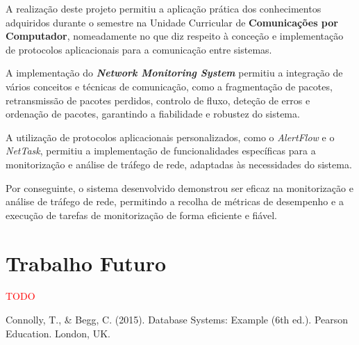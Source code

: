 \documentclass[a4paper,12pt]{scrreprt}
\begin{document}
A realização deste projeto permitiu a aplicação prática dos conhecimentos adquiridos
durante o semestre na Unidade Curricular de \textbf{Comunicações por Computador},
nomeadamente no que diz respeito à conceção e implementação de protocolos aplicacionais
para a comunicação entre sistemas. 

A implementação do \textbf{\textit{Network Monitoring System}} permitiu a integração de
vários conceitos e técnicas de comunicação, como a fragmentação de pacotes, retransmissão
de pacotes perdidos, controlo de fluxo, deteção de erros e ordenação de pacotes, garantindo
a fiabilidade e robustez do sistema.

A utilização de protocolos aplicacionais personalizados, como o \textit{AlertFlow} e o
\textit{NetTask}, permitiu a implementação de funcionalidades específicas para a
monitorização e análise de tráfego de rede, adaptadas às necessidades do sistema.


Por conseguinte, o sistema desenvolvido demonstrou ser eficaz na monitorização e
análise de tráfego de rede, permitindo a recolha de métricas de
desempenho e a execução de tarefas de monitorização de forma eficiente e fiável.

\section{Trabalho Futuro}

\textcolor{red}{
    TODO
}



\renewcommand\bibname{Referências}

\begin{thebibliography}{9}

Connolly, T., \& Begg, C. (2015). Database Systems: Example (6th ed.). Pearson Education. London, UK.


\end{thebibliography}
\end{document}

